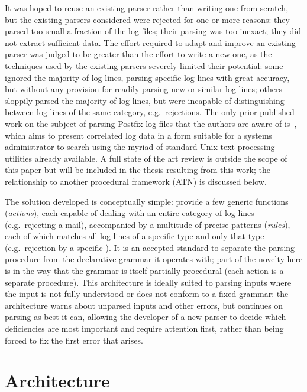 \documentclass{svmult}
\begin{document}
It was hoped to reuse an existing parser rather than writing one from
scratch, but the existing parsers considered were rejected for one or more
reasons: they parsed too small a fraction of the log files; their parsing
was too inexact; they did not extract sufficient data.  The effort required
to adapt and improve an existing parser was judged to be greater than the
effort to write a new one, as the techniques used by the existing parsers
severely limited their potential: some ignored the majority of log lines,
parsing specific log lines with great accuracy, but without any provision
for readily parsing new or similar log lines; others sloppily parsed the
majority of log lines, but were incapable of distinguishing between log
lines of the same category, e.g.\ rejections.  The only prior published
work on the subject of parsing Postfix log files that the authors are aware
of is~\cite{log-mail-analyser}, which aims to present correlated log data
in a form suitable for a systems administrator to search using the myriad
of standard Unix text processing utilities already available.  A full state
of the art review is outside the scope of this paper but will be included
in the thesis resulting from this work; the relationship to another
procedural framework (ATN) is discussed below.

The solution developed is conceptually simple: provide a few generic
functions (\textit{actions\/}), each capable of dealing with an entire
category of log lines (e.g.\ rejecting a mail), accompanied by a multitude
of precise patterns (\textit{rules\/}), each of which matches all log lines
of a specific type and only that type (e.g.\ rejection by a specific
\DNSBL{}).  It is an accepted standard to separate the parsing procedure
from the declarative grammar it operates with; part of the novelty here is
in the way that the grammar is itself partially procedural (each action is
a separate procedure).  This architecture is ideally suited to parsing
inputs where the input is not fully understood or does not conform to a
fixed grammar: the architecture warns about unparsed inputs and other
errors, but continues on parsing as best it can, allowing the developer of
a new parser to decide which deficiencies are most important and require
attention first, rather than being forced to fix the first error that
arises.

\section{Architecture}
\end{document}

